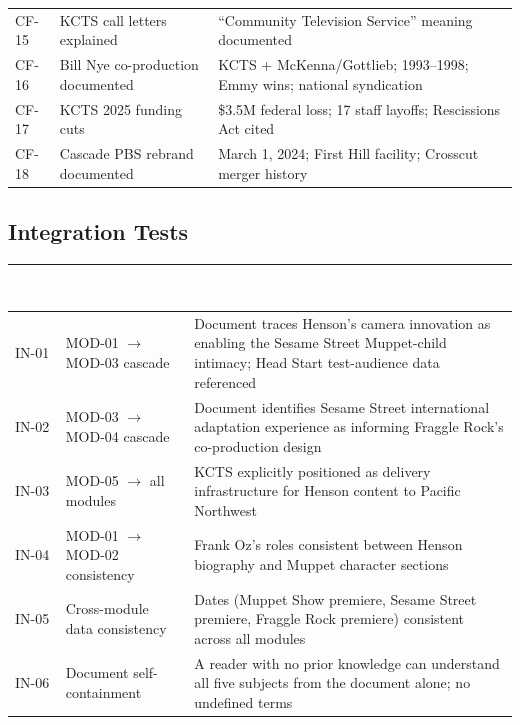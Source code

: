 \documentclass[11pt,letterpaper]{article}
\newcommand{\tableheader}[1]{\textbf{\sffamily\textcolor{white}{#1}}}
\begin{document}
\begin{center}
\begin{tabularx}{\textwidth}{C{1.5cm}L{4.5cm}X}
CF-15 & KCTS call letters explained & ``Community Television Service'' meaning documented \\
CF-16 & Bill Nye co-production documented & KCTS + McKenna/Gottlieb; 1993--1998; Emmy wins; national syndication \\
CF-17 & KCTS 2025 funding cuts & \$3.5M federal loss; 17 staff layoffs; Rescissions Act cited \\
CF-18 & Cascade PBS rebrand documented & March 1, 2024; First Hill facility; Crosscut merger history \\
\bottomrule
\end{tabularx}
\end{center}

\subsection{Integration Tests}

\begin{center}
\begin{tabularx}{\textwidth}{C{1.5cm}L{5cm}X}
\toprule
{}
\tableheader{Test ID} & \tableheader{Verifies} & \tableheader{Expected} \\
\midrule
IN-01 & MOD-01 $\rightarrow$ MOD-03 cascade & Document traces Henson's camera innovation as enabling the Sesame Street Muppet-child intimacy; Head Start test-audience data referenced \\
IN-02 & MOD-03 $\rightarrow$ MOD-04 cascade & Document identifies Sesame Street international adaptation experience as informing Fraggle Rock's co-production design \\
IN-03 & MOD-05 $\rightarrow$ all modules & KCTS explicitly positioned as delivery infrastructure for Henson content to Pacific Northwest \\
IN-04 & MOD-01 $\rightarrow$ MOD-02 consistency & Frank Oz's roles consistent between Henson biography and Muppet character sections \\
IN-05 & Cross-module data consistency & Dates (Muppet Show premiere, Sesame Street premiere, Fraggle Rock premiere) consistent across all modules \\
IN-06 & Document self-containment & A reader with no prior knowledge can understand all five subjects from the document alone; no undefined terms \\
\bottomrule
\end{tabularx}
\end{center}
\end{document}
